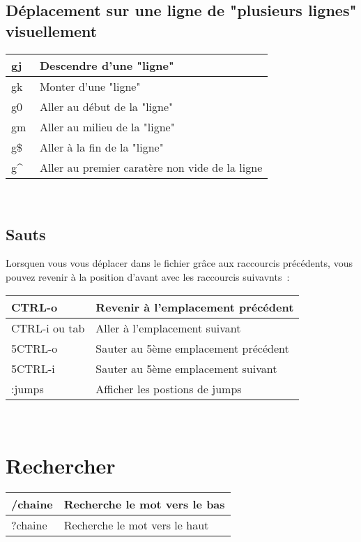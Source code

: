 \documentclass{article}
\begin{document}
\subsection{Déplacement sur une ligne de "plusieurs lignes" visuellement }
\begin{tabular}{|p{3cm}| l|  }
	\hline
gj & Descendre d'une "ligne"\\ \hline
gk & Monter d'une "ligne"\\ \hline
g0 & Aller au début de la "ligne"\\ \hline
gm & Aller au milieu de la "ligne"\\ \hline
g\$ & Aller à la fin de la "ligne"\\ \hline
g\^~ & Aller au premier caratère non vide  de la ligne\\ \hline
\end{tabular}\\

\subsection{Sauts}
Lorsquen vous vous déplacer dans le fichier grâce aux raccourcis précédents, vous pouvez revenir à la position d'avant avec les raccourcis suivavnts~: \\


\begin{tabular}{|p{3cm}| l|  }
	\hline
CTRL-o & Revenir à l'emplacement précédent\\ \hline
CTRL-i ou tab & Aller à l'emplacement suivant\\ \hline
5CTRL-o & Sauter au 5ème emplacement précédent\\ \hline
5CTRL-i & Sauter au 5ème emplacement suivant\\ \hline
:jumps & Afficher les postions de jumps\\ \hline
\end{tabular}\\

\section{Rechercher}  
\begin{tabular}{|p{3cm}| l|  }
	\hline
/chaine & Recherche le mot vers le bas\\ \hline
?chaine & Recherche le mot vers le haut\\ \hline
\end{tabular}\\
\end{document}
